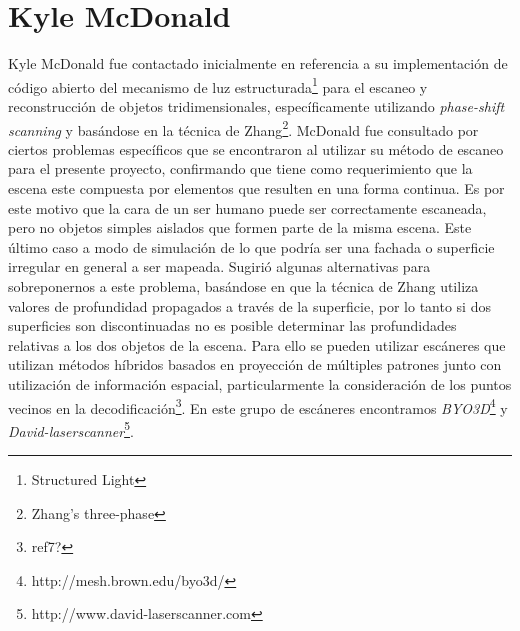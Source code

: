 \section{Kyle McDonald}%
Kyle McDonald \cite{KyleMcDonald} fue contactado inicialmente en referencia a su implementación de código abierto del mecanismo de luz estructurada\footnote{Structured Light} para el escaneo y reconstrucción de objetos tridimensionales, específicamente utilizando \emph{phase-shift scanning} y basándose en la técnica de Zhang\footnote{Zhang's three-phase}. McDonald fue consultado por ciertos problemas específicos %
que se encontraron al utilizar su método de escaneo para el presente proyecto, confirmando que tiene como requerimiento que la escena este compuesta por elementos que resulten en una forma continua. Es por este motivo que la cara de un ser humano puede ser correctamente escaneada, pero no objetos simples aislados que formen parte de la misma escena. Este último caso a modo de simulación de lo que podría ser una fachada o superficie irregular en general a ser mapeada. Sugirió algunas alternativas para sobreponernos a este problema, basándose en que la técnica de Zhang utiliza valores de profundidad propagados a través de la superficie, por lo tanto si dos superficies son discontinuadas no es posible determinar las profundidades relativas a los dos objetos de la escena. Para ello se pueden utilizar escáneres que utilizan métodos híbridos basados en proyección de múltiples patrones junto con utilización de información espacial, particularmente la consideración de los puntos vecinos en la decodificación\footnote{ref7?}. En este grupo de escáneres encontramos \emph{BYO3D}\footnote{http://mesh.brown.edu/byo3d/} y \emph{David-laserscanner}\footnote{http://www.david-laserscanner.com}.